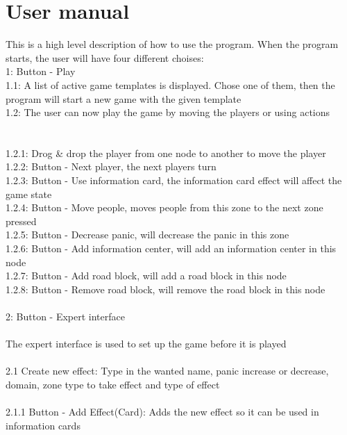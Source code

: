 \section*{User manual}
This is a high level description of how to use the program. When the program starts, the user will have four different choises:\\
1:	Button - Play\\
	1.1: A list of active game templates is displayed. Chose one of them, then the program will start a new game with the given template\\
	1.2: The user can now play the game by moving the players or using actions\\
	\\
	\\
	1.2.1: Drog \& drop the player from one node to another to move the player\\
	1.2.2: Button - Next player, the next players turn\\
	1.2.3: Button - Use information card, the information card effect will affect the game state\\
	1.2.4: Button - Move people, moves people from this zone to the next zone pressed\\
	1.2.5: Button - Decrease panic, will decrease the panic in this zone\\
	1.2.6: Button - Add information center, will add an information center in this node\\
	1.2.7: Button - Add road block, will add a road block in this node\\
	1.2.8: Button - Remove road block, will remove the road block in this node\\
\\
2:	Button - Expert interface\\
\\
	The expert interface is used to set up the game before it is played\\
\\
	2.1 Create new effect: Type in the wanted name, panic increase or decrease, domain, zone type to take effect and type of effect\\
\\
	2.1.1 Button - Add Effect(Card): Adds the new effect so it can be used in information cards\\
\\
